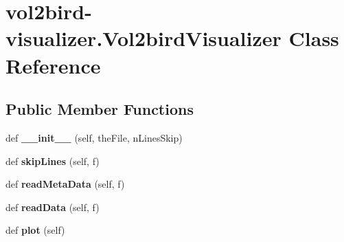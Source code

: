 \hypertarget{classvol2bird-visualizer_1_1Vol2birdVisualizer}{}\section{vol2bird-\/visualizer.Vol2bird\+Visualizer Class Reference}
\label{classvol2bird-visualizer_1_1Vol2birdVisualizer}
\subsection*{Public Member Functions}
\begin{DoxyCompactItemize}
\item 
\mbox{\label{classvol2bird-visualizer_1_1Vol2birdVisualizer_ae5aa45fe9d38f1f418e16b973345d293}} 
def {\bfseries \+\_\+\+\_\+init\+\_\+\+\_\+} (self, the\+File, n\+Lines\+Skip)
\item 
\mbox{\label{classvol2bird-visualizer_1_1Vol2birdVisualizer_af2ec3d16bf6adf5f972b8d739aec397b}} 
def {\bfseries skip\+Lines} (self, f)
\item 
\mbox{\label{classvol2bird-visualizer_1_1Vol2birdVisualizer_a3f001efc03c1b4b03db011b3da479bb5}} 
def {\bfseries read\+Meta\+Data} (self, f)
\item 
\mbox{\label{classvol2bird-visualizer_1_1Vol2birdVisualizer_acd67e3cca94f8726d918521a0f1ad513}} 
def {\bfseries read\+Data} (self, f)
\item 
\mbox{\label{classvol2bird-visualizer_1_1Vol2birdVisualizer_ac72a2657c5008cdd5b4def50ab1ca133}} 
def {\bfseries plot} (self)
\end{DoxyCompactItemize}
